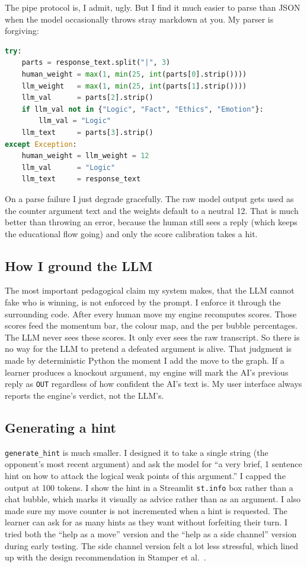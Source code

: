 The pipe protocol is, I admit, ugly. But I find it much easier to parse than JSON when the model occasionally throws stray markdown at you. My parser is forgiving:
\begin{lstlisting}[language=Python]
try:
    parts = response_text.split("|", 3)
    human_weight = max(1, min(25, int(parts[0].strip())))
    llm_weight   = max(1, min(25, int(parts[1].strip())))
    llm_val      = parts[2].strip()
    if llm_val not in {"Logic", "Fact", "Ethics", "Emotion"}:
        llm_val = "Logic"
    llm_text     = parts[3].strip()
except Exception:
    human_weight = llm_weight = 12
    llm_val      = "Logic"
    llm_text     = response_text
\end{lstlisting}
On a parse failure I just degrade gracefully. The raw model output gets used as the counter argument text and the weights default to a neutral 12. That is much better than throwing an error, because the human still sees a reply (which keeps the educational flow going) and only the score calibration takes a hit.

\subsection{How I ground the LLM}
\label{sec:grounding}
The most important pedagogical claim my system makes, that the LLM cannot fake who is winning, is not enforced by the prompt. I enforce it through the surrounding code. After every human move my engine recomputes scores. Those scores feed the momentum bar, the colour map, and the per bubble percentages. The LLM never sees these scores. It only ever sees the raw transcript. So there is no way for the LLM to pretend a defeated argument is alive. That judgment is made by deterministic Python the moment I add the move to the graph. If a learner produces a knockout argument, my engine will mark the AI's previous reply as \texttt{OUT} regardless of how confident the AI's text is. My user interface always reports the engine's verdict, not the LLM's.

\subsection{Generating a hint}
\texttt{generate\_hint} is much smaller. I designed it to take a single string (the opponent's most recent argument) and ask the model for ``a very brief, 1 sentence hint on how to attack the logical weak points of this argument.'' I capped the output at 100 tokens. I show the hint in a Streamlit \texttt{st.info} box rather than a chat bubble, which marks it visually as advice rather than as an argument. I also made sure my move counter is not incremented when a hint is requested. The learner can ask for as many hints as they want without forfeiting their turn. I tried both the ``help as a move'' version and the ``help as a side channel'' version during early testing. The side channel version felt a lot less stressful, which lined up with the design recommendation in Stamper et al.~\cite{stamper2011hints}.

